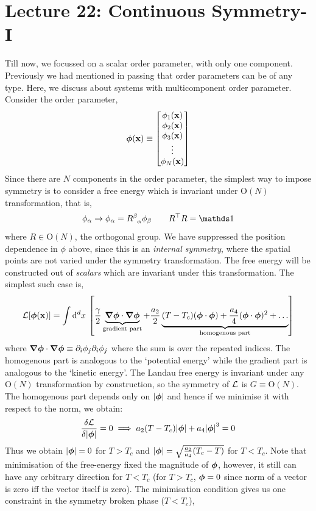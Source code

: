 \section*{Lecture 22: Continuous Symmetry-I}
Till now, we focussed on a scalar order parameter, with only one component. Previously we had mentioned in passing that order parameters can be of any type. Here, we discuss about systems with multicomponent order parameter. Consider the order parameter, 
$$\boldsymbol{\phi}(\vb{x}) \equiv \mqty[\phi_1(\vb{x})\\ \phi_2(\vb{x})\\ \phi_3(\vb{x})\\ \vdots\\ \phi_N(\vb{x})]$$
Since there are $N$ components in the order parameter, the simplest way to impose symmetry is to consider a free energy which is invariant under $\mathrm{O}(N)$ transformation, that is, 
$$\phi_\alpha \to \phi_\alpha = \tensor{R}{^\beta _\alpha} \phi_\beta \qquad R^{\top}R=\iden$$
where $R\in \mathrm{O}(N)$, the orthogonal group. We have suppressed the position dependence in $\phi$ above, since this is an \textit{internal symmetry}, where the spatial points are not varied under the symmetry transformation. The free energy will be constructed out of \textit{scalars} which are invariant under this transformation. The simplest such case is, 
\begin{equation}
    \SL[\bphi(\vb{x})] = \int \dd^dx\ \qty[\frac{\gamma}{2}\underbrace{\grad \bphi \cdot \grad\bphi }_{\text{gradient part}}+ \frac{a_2}{2}\underbrace{(T-T_c)(\bphi \cdot \bphi) + \frac{a_4}{4}(\bphi \cdot \bphi)^2+\ldots}_{\text{homogenous part}}]
 \end{equation}
 where $\grad \boldsymbol{\phi} \cdot \grad\boldsymbol{\phi} \equiv \partial_i\phi_j\partial_i\phi_j$ where the sum is over the repeated indices. The homogenous part is analogous to the `potential energy' while the gradient part is analogous to the `kinetic energy'. The Landau free energy is invariant under any $\mathrm{O}(N)$ transformation by construction, so the symmetry of $\mathcal L$ is $G\equiv \mathrm{O}(N)$.\\[0.2cm]
 The homogenous part depends only on $\abs{\boldsymbol{\phi}}$ and hence if we minimise it with respect to the norm, we obtain: 
 $$\frac{\delta \mathcal L}{\delta \abs{\boldsymbol{\phi}}}=0\implies a_2(T-T_c)\abs{\boldsymbol{\phi}} + a_4\abs{\boldsymbol{\phi}}^3 = 0$$ 
 Thus we obtain $\abs{\boldsymbol{\phi}} = 0$ for $T>T_c$ and $\abs{\boldsymbol{\phi}} = \sqrt{\frac{a_2}{a_4}(T_c-T)}$ for $T<T_c$. Note that minimisation of the free-energy fixed the magnitude of $\boldsymbol{\phi}$, however, it still can have any orbitrary direction for $T<T_c$ (for $T>T_c$, ${\boldsymbol{\phi}}=0$ since norm of a vector is zero iff the vector itself is zero). The minimisation condition gives us one constraint in the symmetry broken phase ($T<T_c$),
